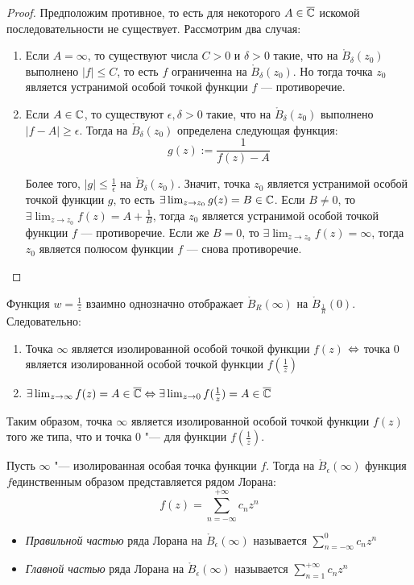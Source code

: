 \begin{proof}
	Предположим противное, то есть для некоторого $A \in \overline{\mathbb{C}}$ искомой последовательности не существует. Рассмотрим два случая:
	\begin{enumerate}
		\item Если $A = \infty$, то существуют числа $C > 0$ и $\delta > 0$ такие, что на $\mathring B_\delta(z_0)$ выполнено $|f| \le C$, то есть $f$ ограниченна на $\mathring B_\delta(z_0)$. Но тогда точка $z_0$ является устранимой особой точкой функции $f$ --- противоречие.
		
		\item Если $A \in \mathbb{C}$, то существуют $\epsilon, \delta > 0$ такие, что на $\mathring B_\delta(z_0)$ выполнено $|f - A| \ge \epsilon$. Тогда на $\mathring B_\delta(z_0)$ определена следующая функция:
		\[g(z) := \frac{1}{f(z) - A}\]
		
		Более того, $|g| \le \frac1\epsilon$ на $\mathring B_\delta(z_0)$. Значит, точка $z_0$ является устранимой особой точкой функции $g$, то есть $\exists \lim_{z \to z_0} g(z) = B \in \mathbb{C}$. Если $B \ne 0$, то $\exists \lim_{z \to z_0} f(z) = A + \frac1B$, тогда $z_0$ является устранимой особой точкой функции $f$ --- противоречие. Если же $B = 0$, то $\exists \lim_{z \to z_0} f(z) = \infty$, тогда $z_0$ является полюсом функции $f$ --- снова противоречие.\qedhere
	\end{enumerate}
\end{proof}

\begin{note}
	Функция $w = \frac1z$ взаимно однозначно отображает $\mathring B_R(\infty)$ на $\mathring B_{\frac1R}(0)$. Следовательно:
	\begin{enumerate}
		\item Точка $\infty$ является изолированной особой точкой функции $f(z)$ $\Leftrightarrow$ точка $0$ является изолированной особой точкой функции $f(\frac1z)$
		\item $\exists \lim_{z \to \infty}f(z) = A \in \overline{\mathbb{C}} \Leftrightarrow \exists \lim_{z \to 0}f(\frac1z) = A \in \overline{\mathbb{C}}$
	\end{enumerate}
	
	Таким образом, точка $\infty$ является изолированной особой точкой функции $f(z)$ того же типа, что и точка $0$ "--- для функции $f(\frac1z)$.
\end{note}

\begin{definition}
	Пусть $\infty$ "--- изолированная особая точка функции $f$. Тогда на $\mathring B_\epsilon(\infty)$ функция $f$единственным образом представляется рядом Лорана:
	\[f(z) = \sum_{n = -\infty}^{+\infty}c_nz^n\]
	\begin{itemize}
		\item \textit{Правильной частью} ряда Лорана на $\mathring B_\epsilon(\infty)$ называется $\sum_{n = -\infty}^{0}c_nz^n$
		\item \textit{Главной частью} ряда Лорана на $\mathring B_\epsilon(\infty)$ называется $\sum_{n = 1}^{+\infty}c_nz^n$
	\end{itemize}
\end{definition}

